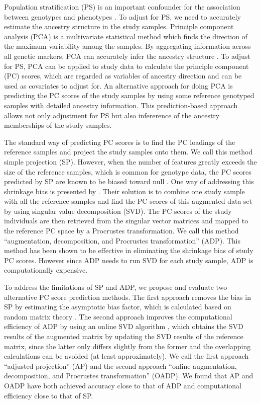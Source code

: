 \documentclass{article}
\begin{document}
Population stratification (PS) is an important confounder for the association between
genotypes and phenotypes \citep{price2006principal}.
To adjust for PS, we need to accurately estimate the ancestry structure in the study samples.
Principle component analysis (PCA) is a multivariate statistical method
which finds the direction of the maximum variability among the samples.
By aggregating information across all genetic markers,
PCA can accurately infer the ancestry structure \citep{reich2008principal}.
To adjust for PS,
PCA can be applied to study data to calculate the principle component (PC) scores,
which are regarded as variables of ancestry direction
and can be used as covariates to adjust for.
An alternative approach for doing PCA is
predicting the PC scores of the study samples
by using some reference genotyped samples with detailed ancestry information.
This prediction-based approach allows not only adjustment for PS
but also infererence of the ancestry memberships of the study samples. 

The standard way of predicting PC scores is to find the PC loadings of the reference samples and project the study samples onto them.
We call this method simple projection (SP).
However, when the number of features greatly exceeds the size of the reference samples,
which is common for genotype data,
the PC scores predicted by SP are known to be biased toward null \citep{dey2016asymptotic}.
One way of addressing this shrinkage bias is presented by \citet{wang2014ancestry, wang2015improved}.
Their solution is to combine one study sample with all the reference samples and
find the PC scores of this augmented data set by using singular value decomposition (SVD).
The PC scores of the study individuals are then retrieved from the singular vector matrices and mapped to the reference PC space by a Procrustes transformation.
We call this method ``augmentation, decomposition, and Procrustes transformation'' (ADP).
This method has been shown to be effective in eliminating the shrinkage bias of study PC scores.
However since ADP needs to run SVD for each study sample,
ADP is computationally expensive.

To address the limitations of SP and ADP,
we propose and evaluate two alternative PC score prediction methods.
The first approach removes the bias in SP by estimating the asymptotic bias factor,
which is calculated based on random matrix theory \citep{dey2016asymptotic}.
The second approach improves the computational efficiency of ADP
by using an online SVD algorithm \citep{halko2011finding}, 
which obtains the SVD results of the augmented matrix
by updating the SVD results of the reference matrix,
since the latter only differs slightly from the former
and the overlapping calculations can be avoided
(at least approximately).
We call the first approach ``adjusted projection'' (AP)
and the second approach ``online augmentation, decomposition, and Procrustes transformation'' (OADP). 
We found that AP and OADP have both achieved accuracy close to that of ADP
and computational efficiency close to that of SP.
\end{document}
